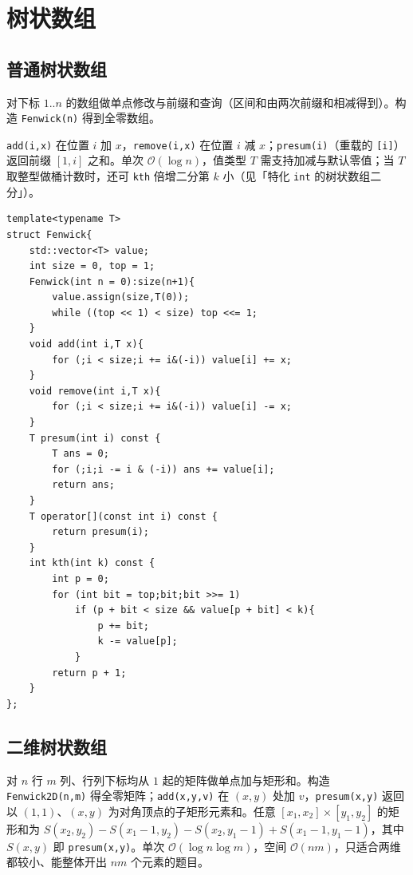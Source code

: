 \section{树状数组}

\subsection{普通树状数组}

\noindent 对下标 $1..n$ 的数组做单点修改与前缀和查询（区间和由两次前缀和相减得到）。构造 \texttt{Fenwick(n)} 得到全零数组。

\texttt{add(i,x)} 在位置 $i$ 加 $x$，\texttt{remove(i,x)} 在位置 $i$ 减 $x$；\texttt{presum(i)}（重载的 \texttt{[i]}）返回前缀 $[1,i]$ 之和。单次 $\mathcal{O}(\log n)$，值类型 $T$ 需支持加减与默认零值；当 $T$ 取整型做桶计数时，还可 \texttt{kth} 倍增二分第 $k$ 小（见「特化 \texttt{int} 的树状数组二分」）。

\begin{lstlisting}
template<typename T>
struct Fenwick{
    std::vector<T> value;
    int size = 0, top = 1;
    Fenwick(int n = 0):size(n+1){
        value.assign(size,T(0));
        while ((top << 1) < size) top <<= 1;
    }
    void add(int i,T x){
        for (;i < size;i += i&(-i)) value[i] += x;
    }
    void remove(int i,T x){
        for (;i < size;i += i&(-i)) value[i] -= x;
    }
    T presum(int i) const {
        T ans = 0;
        for (;i;i -= i & (-i)) ans += value[i];
        return ans;
    }
    T operator[](const int i) const {
        return presum(i);
    }
    int kth(int k) const {
        int p = 0;
        for (int bit = top;bit;bit >>= 1)
            if (p + bit < size && value[p + bit] < k){
                p += bit;
                k -= value[p];
            }
        return p + 1;
    }
};
\end{lstlisting}

\subsection{二维树状数组}

对 $n$ 行 $m$ 列、行列下标均从 $1$ 起的矩阵做单点加与矩形和。构造 \texttt{Fenwick2D(n,m)} 得全零矩阵；\texttt{add(x,y,v)} 在 $(x,y)$ 处加 $v$，\texttt{presum(x,y)} 返回以 $(1,1)$、$(x,y)$ 为对角顶点的子矩形元素和。任意 $[x_1,x_2]\times[y_1,y_2]$ 的矩形和为 $S(x_2,y_2)-S(x_1-1,y_2)-S(x_2,y_1-1)+S(x_1-1,y_1-1)$，其中 $S(x,y)$ 即 \texttt{presum(x,y)}。单次 $\mathcal{O}(\log n\log m)$，空间 $\mathcal{O}(nm)$，只适合两维都较小、能整体开出 $nm$ 个元素的题目。

